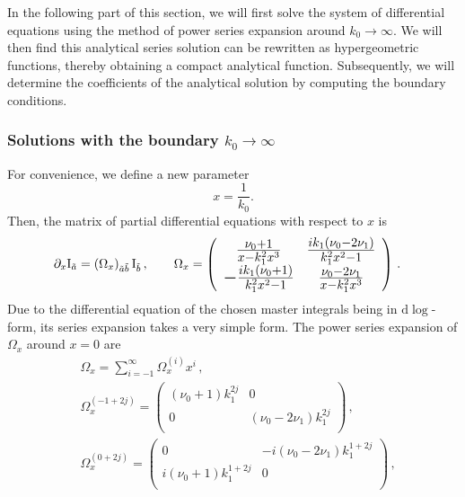 \documentclass[a4paper,11pt]{article}
\newcommand{\nn}{\nonumber}
\newcommand{\nd}{\mathrm{d}}
\begin{document}
In the following part of this section, we will first solve the system of differential equations using the method of power series expansion around $k_0\to \infty$. We will then find this analytical series solution can be rewritten as hypergeometric functions, thereby obtaining a compact analytical function. Subsequently, we will determine the coefficients of the analytical solution by computing the boundary conditions. 


\subsubsection{Solutions with the boundary $k_0\to \infty$} \label{sec:1v1fk0inf}
For convenience, we define a new parameter 
\begin{equation}
x=\frac{1}{k_0}.
\end{equation} 
Then, the matrix of partial differential equations with respect to $x$ is
\begin{align}
&\partial_x \text{I}_{\tilde{a}} = \left(\Omega_x\right)_{\tilde{a} \tilde{b}} \text{I}_{\tilde{b}}   \, , ~~~~~~\Omega_x = \left( 
\begin{Large}
\begin{array}{cc}
 \frac{\nu _0+1}{x-k_1^2 x^3} & \frac{i k_1 \left(\nu _0-2 \nu _1\right)}{k_1^2 x^2-1} \\
 -\frac{i k_1 \left(\nu _0+1\right)}{k_1^2 x^2-1} & \frac{\nu _0-2 \nu _1}{x-k_1^2 x^3} \\
\end{array}
\end{Large}
\right)  \,.  \label{eq:DEx1V1fk0inf}
\end{align} 
Due to the differential equation of the chosen master integrals being in  $\nd \log$-form, its series expansion takes a very simple form. The power series expansion of $\Omega_x$ around $x = 0$ are
\begin{align}
&\Omega_x = \sum_{i=-1}^\infty \Omega_x^{(i)} x^{i} \,, \nn\\
&\Omega_x^{(-1+2j)}=\left(
\begin{array}{cc}
 \left(\nu _0+1\right) k_1^{2j} & 0 \\
 0 &\left(\nu_0-2 \nu _1\right) k_1^{2j} \\
\end{array}
\right)     \,,\nn\\
&\Omega_x^{(0+2j)}=\left(
\begin{array}{cc}
 0 & -i  \left(\nu _0-2 \nu _1\right)k_1^{1+2j} \\
 i \left(\nu _0+1\right) k_1^{1+2j} & 0 \\
\end{array}
\right) \,, \label{eq:1vexpansionDE}
\end{align}
\end{document}
